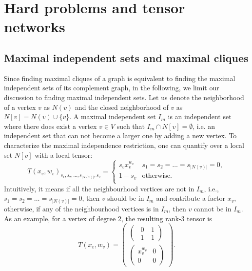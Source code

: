 \documentclass[onefignum, onetabnum]{siamart190516}
\newcommand{\<}{\langle}
\renewcommand{\>}{\rangle}
\newcounter{example}
\begin{document}
\section{Hard problems and tensor networks}\label{sec:otherproblems}
\subsection{Maximal independent sets and maximal cliques}\label{sec:maximal}
Since finding maximal cliques of a graph is equivalent to finding the maximal independent sets of its complement graph, in the following,
we limit our discussion to finding maximal independent sets.
Let us denote the neighborhood of a vertex $v$ as $N(v)$ and the closed neighborhood of $v$ as $N[v] = N(v)\cup \{v\}$.
A maximal independent set $I_m$ is an independent set where there does exist a vertex $v \in V$ such that $I_m \cap N[v]  = \emptyset$,
i.e. an independent set that can not become a larger one by adding a new vertex.
To characterize the maximal independence restriction, one can quantify over a local set $N[v]$ with a local tensor:
\begin{equation}\label{eq:maximal}
    T(x_v, w_v)_{s_1,s_2,\ldots,s_{|N(v)|},s_v} = \begin{cases}
        s_vx_v^{w_v} & s_1=s_2=\ldots=s_{|N(v)|}=0,\\
        1-s_v& \text{otherwise}.\\
    \end{cases}
\end{equation}
Intuitively, it means if all the neighbourhood vertices are not in $I_{m}$, i.e., $ s_1=s_2=\ldots=s_{|N(v)|}=0$, then $v$ should be in $I_{m}$ and contribute a factor $x_{v}$,
otherwise, if any of the neighbourhood vertices is in $I_{m}$, then $v$ cannot be in $I_{m}$.
As an example, for a vertex of degree 2, the resulting rank-3 tensor is
\begin{equation}
    T(x_v, w_v)=\left(\begin{matrix}
    \left(\begin{matrix}
        ~~0 &~1 \\
        ~~1 &~1
    \end{matrix}\right)\\
    \left(\begin{matrix}
        x_v^{w_v} &0 \\
        0 &0
    \end{matrix}\right)
    \end{matrix}\right).
\end{equation}
 
\end{document}
